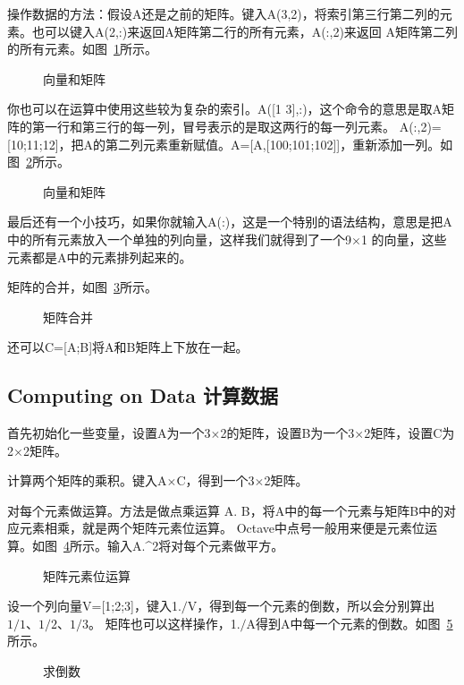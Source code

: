 \documentclass[UTF8]{ctexart}
\begin{document}
操作数据的方法：假设A还是之前的矩阵。键入A(3,2)，将索引第三行第二列的元素。也可以键入A(2,:)来返回A矩阵第二行的所有元素，A(:,2)来返回
A矩阵第二列的所有元素。如图~\ref{fig:14}所示。
\begin{figure}[H]
 \caption{向量和矩阵}
 \label{fig:14}
 \end{figure}

你也可以在运算中使用这些较为复杂的索引。A([1 3],:)，这个命令的意思是取A矩阵的第一行和第三行的每一列，冒号表示的是取这两行的每一列元素。
A(:,2)=[10;11;12]，把A的第二列元素重新赋值。A=[A,[100;101;102]]，重新添加一列。如图~\ref{fig:15}所示。
\begin{figure}[H]
 \caption{向量和矩阵}
 \label{fig:15}
 \end{figure}

最后还有一个小技巧，如果你就输入A(:)，这是一个特别的语法结构，意思是把A中的所有元素放入一个单独的列向量，这样我们就得到了一个9$\times$1
的向量，这些元素都是A中的元素排列起来的。

矩阵的合并，如图~\ref{fig:16}所示。
\begin{figure}[H]
 \caption{矩阵合并}
 \label{fig:16}
\end{figure}

还可以C=[A;B]将A和B矩阵上下放在一起。

\subsection{Computing on Data 计算数据}
首先初始化一些变量，设置A为一个3$\times$2的矩阵，设置B为一个3$\times$2矩阵，设置C为2$\times$2矩阵。

计算两个矩阵的乘积。键入A$\times$C，得到一个3$\times$2矩阵。

对每个元素做运算。方法是做点乘运算 A.\* B，将A中的每一个元素与矩阵B中的对应元素相乘，就是两个矩阵元素位运算。
Octave中点号一般用来便是元素位运算。如图~\ref{fig:17}所示。输入A.\^{}2将对每个元素做平方。
\begin{figure}[H]
 \caption{矩阵元素位运算}
 \label{fig:17}
\end{figure}

设一个列向量V=[1;2;3]，键入1.$/$V，得到每一个元素的倒数，所以会分别算出 $1/1、1/2、1/3$。
矩阵也可以这样操作，1.$/$A得到A中每一个元素的倒数。如图~\ref{fig:18}所示。
\begin{figure}[H]
 \caption{求倒数}
 \label{fig:18}
\end{figure}
\end{document}
